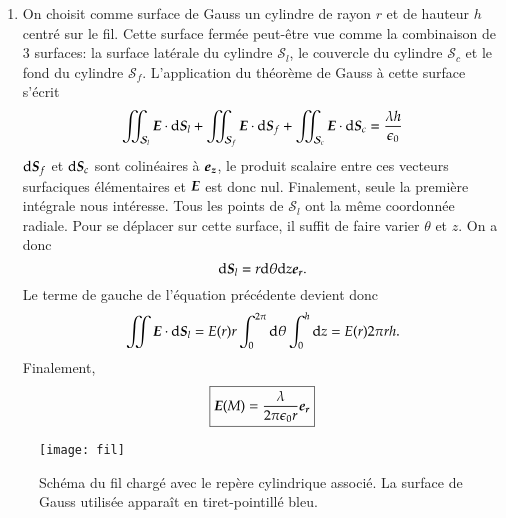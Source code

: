 \begin{corrige}
\begin{enumerate}
	\item On choisit comme surface de Gauss un cylindre de rayon $r$ et de 
	  hauteur $h$ centré sur le fil. Cette surface fermée peut-être vue comme
	  la combinaison de 3 surfaces: la surface latérale du cylindre $\mathcal{S}_l$,
	  le couvercle du cylindre $\mathcal{S}_c$ et le fond du cylindre $\mathcal{S}_f$.
	  L'application du théorème de Gauss à cette surface s'écrit
	  \begin{equation*}
		  \iint_{\mathcal{S}_l} \vece \cdot \ds_l + 
		  \iint_{\mathcal{S}_f} \vece \cdot \ds_f +
	  	  \iint_{\mathcal{S}_c} \vece \cdot \ds_c =
		  \dfrac{\lambda h}{\epsilon_0}
	 \end{equation*}
	 $\ds_f$ et $\ds_c$ sont colinéaires à $\ez$, le produit scalaire
	 entre ces vecteurs surfaciques élémentaires et $\vece$ est donc nul.
	 Finalement, seule la première intégrale nous intéresse. Tous les points 
	 de $\mathcal{S}_l$ ont la même coordonnée radiale. Pour se déplacer sur cette 
	 surface, il suffit de faire varier $\theta$ et $z$. On a donc
	 \begin{equation*}
		 \ds_l = r \dtheta \dz \er.
	\end{equation*}
	Le terme de gauche de l'équation précédente devient donc
	\begin{equation*}
		\iint \vece \cdot \ds_l = E(r)r \int_0^{2\pi}\dtheta \int_0^h\dz
		= E(r) 2\pi rh.
	\end{equation*}
	Finalement, 
	\begin{equation*}
		\boxed{\vece(M) = \dfrac{\lambda}{2 \pi \epsilon_0 r}\er}
	\end{equation*}
\end{enumerate}
\end{corrige}

\begin{figure}[]
	\centering
	\texttt{[image: fil]}
	\caption{Schéma du fil chargé avec le repère cylindrique associé. 
		La surface de Gauss utilisée apparaît en tiret-pointillé bleu.}%
	\label{fig:fil}
\end{figure}

